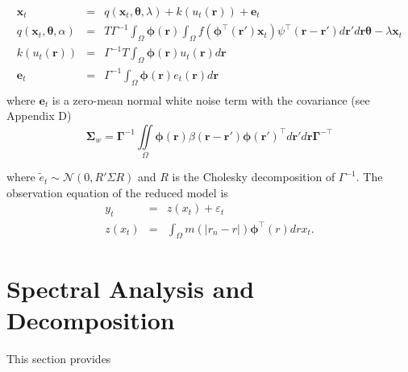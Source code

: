 \documentclass[onecolumn,draftcls]{IEEEtran}
\begin{document}
\begin{eqnarray}\label{Homogeneous SS Model}
	\mathbf{x}_t &=& q(\mathbf{x}_t,\mathbf{\theta},\lambda) + k\left(u_t\left(\mathbf{r}\right)\right) + \mathbf{e}_t \\
	q(\mathbf{x}_t,\mathbf{\theta},\alpha) &=& T\Gamma^{ - 1}\int_\Omega {\boldsymbol{\phi}\left(\mathbf{r}\right) \int_\Omega {f\left(\boldsymbol{\phi}^{\top}\left(\mathbf{r}'\right)\mathbf{x}_t\right)\psi^{\top} \left(\mathbf{r}-\mathbf{r}'\right)d\mathbf{r}'} d\mathbf{r}} \mathbf{\theta} - \lambda \mathbf{x}_t \\
	k(u_t(\mathbf{r})) &=& \Gamma^{-1}T \int_\Omega{\boldsymbol{\phi} \left(\mathbf{r}\right) u_t\left(\mathbf{r}\right)d\mathbf{r}} \\
	\mathbf{e}_t &=& \Gamma^{-1}\int_\Omega{\boldsymbol{\phi}\left(\mathbf{r}\right)e_t\left(\mathbf{r}\right)d\mathbf{r}} \\
\end{eqnarray}
where $\mathbf{e}_t$ is a zero-mean normal white noise term with the covariance (see Appendix D)
\begin{equation} 
\mathbf \Sigma_w=\mathbf{\Gamma}^{-1}\iint\limits_{\Omega}\boldsymbol{\phi}\left(\mathbf r\right) \beta\left(\mathbf{r}- \mathbf{r}' \right)\boldsymbol{\phi}\left(\mathbf{r}'\right)^{\top}d\mathbf{r}' d\mathbf{r}\mathbf{\Gamma}^{- \top} 
\end{equation}


where $\tilde{e}_t \sim \mathcal{N}\left(0,R' \Sigma R\right)$ and $R$ is the Cholesky decomposition of $\Gamma^{-1}$. The observation equation of the reduced model is
\begin{eqnarray}\label{ObservationEquation}
    y_t &=& z\left(x_t\right) + \varepsilon_t \\
	z\left(x_t\right) &=& \int_\Omega m\left(|r_n-r|\right)\boldsymbol{\phi}^{\top}\left(r\right) dr x_t.
\end{eqnarray}

\section{Spectral Analysis and Decomposition}
This section provides
\end{document}
